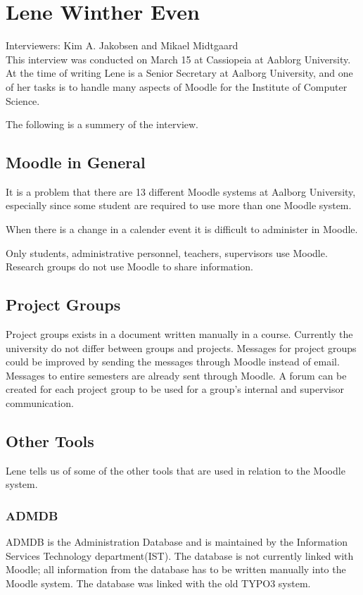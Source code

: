 \section{Lene Winther Even}
\label{sec:lene}
Interviewers: Kim A. Jakobsen and Mikael Midtgaard\\


This interview was conducted on March 15\ths{} at Cassiopeia at Aablorg University.
At the time of writing Lene is a Senior Secretary at Aalborg University, and one of her tasks is to handle many aspects of Moodle for the Institute of Computer Science.

The following is a summery of the interview.

\subsection*{Moodle in General}
It is a problem that there are 13 different Moodle systems at Aalborg University, especially since some student are required to use more than one Moodle system.

When there is a change in a calender event it is difficult to administer in Moodle.

Only students, administrative personnel, teachers, supervisors use Moodle.
Research groups do not use Moodle to share information.

\subsection*{Project Groups}
Project groups exists in a document written manually in a course.
Currently the university do not differ between groups and projects.
Messages for project groups could be improved by sending the messages through Moodle instead of email.
Messages to entire semesters are already sent through Moodle.
A forum can be created for each project group to be used for a group's internal and supervisor communication.

\subsection*{Other Tools}
Lene tells us of some of the other tools that are used in relation to the Moodle system.

\subsubsection*{ADMDB}
ADMDB is the Administration Database and is maintained by the Information Services Technology department(IST).
The database is not currently linked with Moodle; all information from the database has to be written manually into the Moodle system.
The database was linked with the old TYPO3 system.

